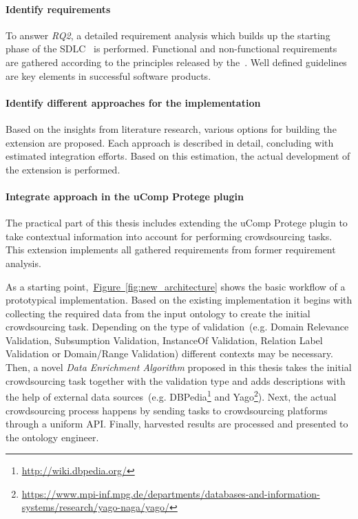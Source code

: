 \documentclass[12pt, notitlepage]{article}
\begin{document}
\paragraph{Identify requirements}
To answer \emph{RQ2}, a detailed requirement analysis which builds up the starting phase of the SDLC~\cite{ruparelia2010} is performed. Functional and non-functional requirements are gathered according to the principles released by the~\citet{ieeeSoftwareRequirements}. Well defined guidelines are key elements in successful software products. 
\paragraph{Identify different approaches for the implementation}
Based on the insights from literature research, various options for building the extension are proposed. Each approach is described in detail, concluding with estimated integration efforts. Based on this estimation, the actual development of the extension is performed. 
\paragraph{Integrate approach in the uComp Protege plugin}
The practical part of this thesis includes extending the uComp Protege plugin to take contextual information into account for performing crowdsourcing tasks. This extension implements all gathered requirements from former requirement analysis.

As a starting point,~\hyperref[fig:new_architecture]{Figure~\ref*{fig:new_architecture}} shows the basic workflow of a prototypical implementation. Based on the existing implementation it begins with collecting the required data from the input ontology to create the initial crowdsourcing task. Depending on the type of validation~(e.g. Domain Relevance Validation, Subsumption Validation, InstanceOf Validation, Relation Label Validation or Domain/Range Validation) different contexts may be necessary. Then, a novel \emph{Data Enrichment Algorithm} proposed in this thesis takes the initial crowdsourcing task together with the validation type and adds descriptions with the help of external data sources~(e.g. DBPedia\footnote{\url{http://wiki.dbpedia.org/}} and Yago\footnote{\url{https://www.mpi-inf.mpg.de/departments/databases-and-information-systems/research/yago-naga/yago/}}). Next, the actual crowdsourcing process happens by sending tasks to crowdsourcing platforms through a uniform API. Finally, harvested results are processed and presented to the ontology engineer. 
\end{document}
